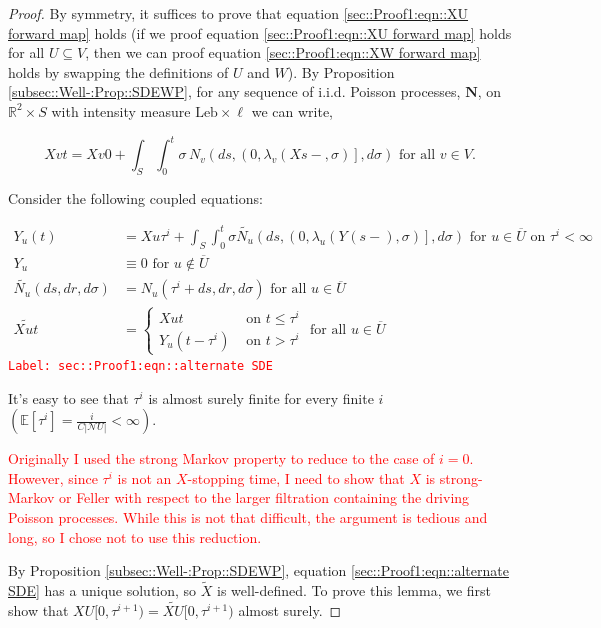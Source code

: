 \documentclass[12pt]{article}
\newcommand{\mb}{\mathbb}
\newcommand{\mc}{\mathcal}
\newcommand{\ov}{\overline}
\newcommand{\te}{\text}
\newcommand{\tr}{\textcolor{red}}
\newcommand{\labe}[1]{\tr{\texttt{Label: #1}}}
\newcommand{\ind}{\hspace{24pt}}
\newcommand{\ex}[1]{\mb{E}\left[#1\right]}			%
\renewcommand{\v}{v}							%
\newcommand{\vv}{u}								%
\renewcommand{\U}{U}							%
\newcommand{\UU}{W}								%
\renewcommand{\S}{S}							%
\newcommand{\s}{\sigma}							%
\renewcommand{\t}{t}							%
\renewcommand{\tt}{s}							%
\newcommand{\X}{X}								%
\newcommand{\neigh}{\mc{N}}						%
\newcommand{\cl}{\ov}							%
\newcommand{\const}{C}							%
\newcommand{\poiss}[1]{N_{#1}}						%
\newcommand{\poisses}{\mathbf{N}}				%
\newcommand{\leb}{\te{Leb}}							%
\renewcommand{\r}{r}								%
\newcommand{\rt}[1]{\tau^{#1}}						%
\newcommand{\itt}{i}								%
\newcommand{\rxvtt}[2]{Y_{#1}{(#2)}}				%
\newcommand{\rxvtts}[2]{Y_{#1}{#2}}					%
\newcommand{\rate}[1]{\lambda_{#1}}					%
\newcommand{\Sm}{\ell}								%
\newcommand{\alt}{\widetilde}						%
\begin{document}
\begin{proof}
By symmetry, it suffices to prove that equation \ref{sec::Proof1:eqn::XU forward map} holds (if we proof equation \eqref{sec::Proof1:eqn::XU forward map} holds for all \(\U \subseteq  V\), then we can proof equation \eqref{sec::Proof1:eqn::XW forward map} holds by swapping the definitions of \(\U\) and \(\UU\)). By Proposition \ref{subsec::Well-:Prop::SDEWP}, for any sequence of i.i.d. Poisson processes, \(\poisses\), on \(\mb{R}^2\times \S\) with intensity measure \(\leb\times\Sm\) we can write,

\[\X{\v}{\t} = \X{\v}{0} + \int_\S\int_0^\t \s\,\poiss{\v}\left(d\tt,\left(0,\rate{\v}(\X{}{\tt-},\s)\right],d\s\right)\te{ for all } \v\in  V.\]

Consider the following coupled equations:

\begin{align}
\rxvtt{\vv}{\t} &= \X{\vv}{\rt{\itt}} + \int_\S\int_0^\t \s\alt{\poiss{\vv}}\left(d\tt,\left(0,\rate{\vv}(\rxvtt{}{\tt-},\s)\right],d\s\right)\te{ for } \vv \in \cl{\U} \te{ on } \rt{\itt} < \infty \label{sec::Proof1:eqn::alternate SDE}\\
\rxvtts{\vv}{} &\equiv 0\te{ for } \vv\notin \cl{\U}\nonumber\\
\alt{\poiss{\vv}}(d\tt,d\r,d\s) &= \poiss{\vv}(\rt{\itt} + d\tt,d\r,d\s) \te{ for all }\vv\in \cl{\U}\nonumber\\
\alt{\X{\vv}{\t}} &= \begin{cases}
\X{\vv}{\t} &\te{ on } \t \leq \rt{\itt}\\
\rxvtt{\vv}{\t - \rt{\itt}} &\te{ on } \t > \rt{\itt}
\end{cases} \te{ for all } \vv\in \cl{\U} \nonumber
\end{align}
\labe{sec::Proof1:eqn::alternate SDE}

It's easy to see that \(\rt{\itt}\) is almost surely finite for every finite \(\itt\) \(\left(\ex{\rt{\itt}} = \frac{\itt}{\const{}|\neigh{\U}|} < \infty\right)\). 

\ind \tr{Originally I used the strong Markov property to reduce to the case of \(\itt = 0\). However, since \(\rt{\itt}\) is not an \(\X{}{}\)-stopping time, I need to show that \(\X{}{}\) is strong-Markov or Feller with respect to the larger filtration containing the driving Poisson processes. While this is not that difficult, the argument is tedious and long, so I chose not to use this reduction.}

\ind By Proposition \ref{subsec::Well-:Prop::SDEWP}, equation \eqref{sec::Proof1:eqn::alternate SDE} has a unique solution, so \(\alt{\X{}{}}\) is well-defined. To prove this lemma, we first show that \(\X{\U}{[0,\rt{\itt+1})} = \alt{\X{\U}{}}{[0,\rt{\itt+1})}\) almost surely. 


\end{proof}
\end{document}
